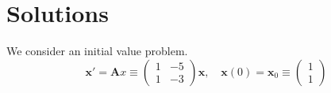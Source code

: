 \raggedbottom
\pagebreak
\flushbottom
\section{Solutions}





\begin{Solution}
  \label{solution x'=(1-51-3)x t-infinity}
  We consider an initial value problem.
  \[
  \mathbf{x}' = \mathbf{A} x \equiv
  \begin{pmatrix}
    1 & -5 \\
    1 & -3
  \end{pmatrix} 
  \mathbf{x}, \quad 
  \mathbf{x}(0) = \mathbf{x}_0 \equiv
  \begin{pmatrix}
    1 \\
    1
  \end{pmatrix}
  \]


\end{Solution}
